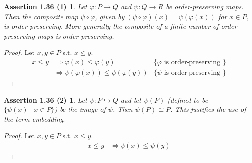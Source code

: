 \newtheorem*{assertion-1.36-1}{Assertion 1.36 (1)}
\begin{assertion-1.36-1} Let $\varphi: P \rightarrow Q$ and $\psi: Q \rightarrow R$ be order-preserving maps. Then the composite map $\psi \circ \varphi$, given by $(\psi \circ \varphi)(x) = \psi(\varphi(x))$ for $x \in P$, is order-preserving. More generally the composite of a finite number of order-preserving maps is order-preserving.  
\end{assertion-1.36-1}
\begin{proof} Let $x, y \in P$ s.t. $x \leq y$. 
\begin{align*}
  x \leq y & \Rightarrow \varphi(x) \leq \varphi(y) & \{ \varphi \mbox{ is order-preserving } \}\\
           & \Rightarrow \psi(\varphi(x)) \leq \psi(\varphi(y)) & \{ \psi \mbox{ is order-preserving } \}
\end{align*}
\end{proof}
\newtheorem*{assertion-1.36-2}{Assertion 1.36 (2)}
\begin{assertion-1.36-2} Let $\psi: P \hookrightarrow Q$ and let $\psi(P)$ (defined to be $\{ \psi(x) \mid x \in P \}$) be the image of $\psi$. Then $\psi(P) \cong P$. This justifies the use of the term embedding.
\end{assertion-1.36-2}
\begin{proof} Let $x, y \in P$ s.t. $x \leq y$.
\begin{align*} x \leq y & \Leftrightarrow \psi(x) \leq \psi(y)
\end{align*}
\end{proof}